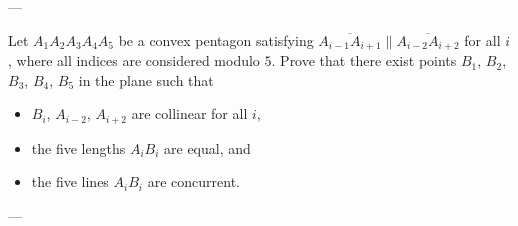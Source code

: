 
---

Let $A_1A_2A_3A_4A_5$ be a convex pentagon satisfying $\overline{A_{i-1}A_{i+1}}\parallel\overline{A_{i-2}A_{i+2}}$ for all $i$, where all indices are considered modulo $5$. Prove that there exist points $B_1$, $B_2$, $B_3$, $B_4$, $B_5$ in the plane such that
\begin{itemize}[itemsep=0em]
    \item $B_i$, $A_{i-2}$, $A_{i+2}$ are collinear for all $i$,
    \item the five lengths $A_iB_i$ are equal, and
    \item the five lines $A_iB_i$ are concurrent.
\end{itemize}

---

